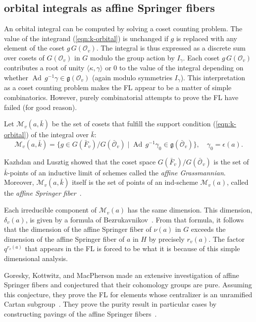 \documentclass[brochure,english,12pt]{bourbaki}
\theoremstyle{plain}
\def\op#1{{\operatorname{#1}}}
\def\g{\mathfrak{g}}
\def\M{{\mathcal M}}
\def\O{{\mathcal O}}
\begin{document}
\subsection{orbital integrals as affine Springer fibers}\label{sec:coset}

An orbital integral can be computed by solving a coset counting
problem.  The value of the integrand (\ref{eqn:k-orbital}) is
unchanged if $g$ is replaced with any element of the coset
$g\,G(\O_v)$.  The integral is thus expressed as a discrete sum over
cosets of $G(\O_v)$ in $G$ modulo the group action by $I_\gamma$.
Each coset $g\, G(\O_v)$ contributes a root of unity
$\langle\kappa,\gamma\rangle$ or $0$ to the value of the integral
depending on whether $\op{Ad}\,g^{-1}\gamma \in \g(\O_v)$ (again
modulo symmetries $I_\gamma$).  This interpretation as a coset
counting problem makes the FL appear to be a matter of simple
combinatorics.  However, purely combinatorial attempts to prove the FL
have failed (for good reason).

Let $\M_v(a,\bar k)$ be the set of cosets that fulfill the support
condition (\ref{eqn:k-orbital}) of the integral over $\bar k$:
\[
\M_v(a,\bar k) = \{g\in G(\bar F_v)/G(\bar \O_v) 
\mid \op{Ad}\,g^{-1} \gamma_0 \in \g(\bar\O_v)\}, 
\quad \gamma_0 = \epsilon(a).
\]

Kazhdan and Lusztig showed that the coset space $G(\bar
F_v)/G(\bar\O_v)$ is the set of $\bar k$-points of an inductive limit
of schemes called the {\it affine Grassmannian}.  Moreover, $\M_v(a,\bar k)$ itself
is the set of points of an ind-scheme $\M_v(a)$, called the {\it affine
Springer fiber}~\cite{KL:1988}.

Each irreducible component of $\M_v(a)$ has the same dimension.  This
dimension, $\delta_v(a)$, is given by a formula of
Bezrukavnikov~\cite{Bezrukavnikov}.  From that formula, it follows
that the dimension of the affine Springer fiber of $\nu(a)$ in $G$
exceeds the dimension of the affine Springer fiber of $a$ in $H$ by
precisely $r_v(a)$.  The factor $q^{r_v(a)}$ that appears in the FL is
forced to be what it is because of this simple dimensional analysis.

Goresky, Kottwitz, and MacPherson made an extensive investigation of
affine Springer fibers and conjectured that their 
cohomology groups are pure.  Assuming this conjecture, they prove the
FL for elements whose centralizer is an unramified Cartan
subgroup~\cite{GKM:2004}.  They prove the purity result in particular
cases by constructing pavings of the affine Springer
fibers~\cite{GKM:2006}.  
\end{document}
